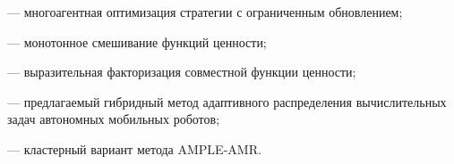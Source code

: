 \begin{description}[style=multiline,leftmargin=4.7cm,labelwidth=4.4cm,labelsep=0.3cm]
    \item[\mbox{MAPPO}] --- многоагентная оптимизация стратегии с ограниченным обновлением;
    \item[\mbox{QMIX}] --- монотонное смешивание функций ценности;
    \item[\mbox{QPLEX}] --- выразительная факторизация совместной функции ценности;
    \item[\mbox{AMPLE-AMR}] --- предлагаемый гибридный метод адаптивного распределения вычислительных задач автономных мобильных роботов;
    \item[\mbox{C-AMPLE-AMR}] --- кластерный вариант метода AMPLE-AMR.
\end{description}
